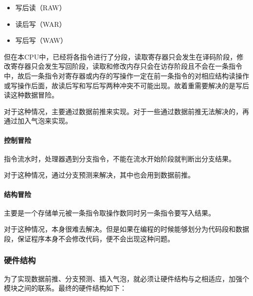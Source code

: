\documentclass[12pt]{article}
\begin{document}
\begin{CJK*}{GB}{gbsn}
\begin{itemize}
\itemsep1pt\parskip0pt
\item
  写后读（RAW）
\item
  读后写（WAR）
\item
  写后写（WAW）
\end{itemize}

但在本CPU中，已经将各指令进行了分段，读取寄存器只会发生在译码阶段，修改寄存器只会发生写回阶段，读取和修改内存只会在访存阶段且不会在一条指令中，故后一条指令对寄存器或内存的写操作一定在前一条指令的对相应结构读操作或写操作后面，故读后写和写后写两种冲突不可能出现。故着重需要解决的是写后读这种数据冒险。

对于这种情况，主要通过数据前推来实现。对于一些通过数据前推无法解决的，再通过加入气泡来实现。

\paragraph{控制冒险}\label{ux63a7ux5236ux5192ux9669}

指令流水时，处理器遇到分支指令，不能在流水开始阶段就判断出分支结果。

对于这种情况，通过分支预测来解决，其中也会用到数据前推。

\paragraph{结构冒险}\label{ux7ed3ux6784ux5192ux9669}

主要是一个存储单元被一条指令取操作数同时另一条指令要写入结果。

对于这种情况，本身很难去解决。但是如果在编程的时候能够划分为代码段和数据段，保证程序本身不会修改代码，便不会出现这种问题。

\subsubsection{硬件结构}\label{ux786cux4ef6ux7ed3ux6784-1}

为了实现数据前推、分支预测、插入气泡，就必须让硬件结构与之相适应，加强个模块之间的联系。最终的硬件结构如下：


\end{CJK*}
\end{document}
